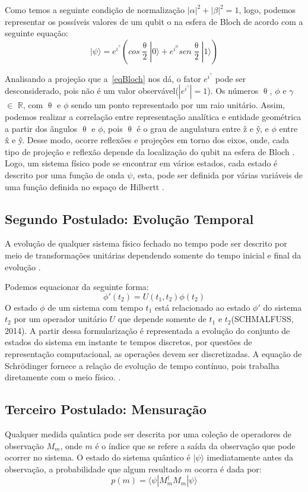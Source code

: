 \documentclass[tcc,capa]{texufpel}
\begin{document}
Como temos a seguinte condição de normalização  $|\alpha|^2 + |\beta|^2=1$, logo, podemos representar os possíveis valores de um qubit o na esfera de Bloch de acordo com a seguinte equação:
\begin{equation}
    |\psi\rangle= e^i^\gamma(cos\frac{\uptheta}{2}|0\rangle + e^i^\phi sen\frac{\uptheta}{2}|1\rangle )
    \label{eqBloch}
\end{equation}

Analisando a projeção que a~\ref{eqBloch} nos dá, o fator $e^i^\gamma$ pode ser desconsiderado, pois não é um valor observável($|e^i^\gamma|=1$). Os números $\uptheta$, $\phi$ e $\gamma$ $\in$ $\mathbb{R}$,  com $\uptheta$ e $\phi$ sendo um ponto representado por um raio unitário. Assim, podemos realizar a correlação entre representação analítica e entidade geométrica a partir dos ângulos $\uptheta$ e $\phi$, pois $\uptheta$ é o grau de angulatura entre \^{z} e \^{y}, e $\phi$ entre \^{x} e \^{y}. Desse modo, ocorre reflexões e projeções em torno dos eixos, onde, cada tipo de projeção e reflexão depende da localização do qubit na esfera de Bloch \cite{chuang00a}. 
Logo, um sistema físico pode se encontrar em vários estados, cada estado é descrito por uma função de onda $\psi$, esta, pode ser definida por várias variáveis de uma função definida no espaço de Hilbertt \cite{courteille2014mecanica}.
\subsection{Segundo Postulado: Evolução Temporal}
A evolução de qualquer sistema físico fechado no tempo pode ser descrito por meio de transformações unitárias dependendo somente do tempo inicial e final da evolução \cite{imre2005quantum}.

Podemos equacionar da seguinte forma: 
\begin{equation}
    \phi'(t_2)= U(t_1,t_2)\phi(t_2)
\end{equation}
O estado $\phi$ de um sistema com tempo $t_1$ está relacionado ao estado $\phi'$ do sistema  $t_2$ por um operador unitário $U$ que depende somente de $t_1$ e $t_2$(SCHMALFUSS, 2014). 
A partir dessa formularização é representada a evolução do conjunto de estados do sistema em instante te tempos discretos, por questões de representação computacional, as operações devem ser discretizadas. A equação de Schrödinger fornece a relação de evolução de tempo contínuo, pois trabalha diretamente com o meio físico. \cite{imre2005quantum}.

\subsection{Terceiro Postulado: Mensuração}
Qualquer medida quântica pode ser descrita por uma coleção de operadores de observação $M_m$, onde $m$ é o índice que se refere a saída da observação que pode ocorrer no sistema. O estado do sistema quântico é $|\psi\rangle$ imediatamente antes da observação, a probabilidade que algum resultado $m$ ocorra é dada por:
\begin{equation}
    p(m)= \langle\psi|M^\dagger_mM_m|\psi\rangle
\end{equation}
\end{document}

